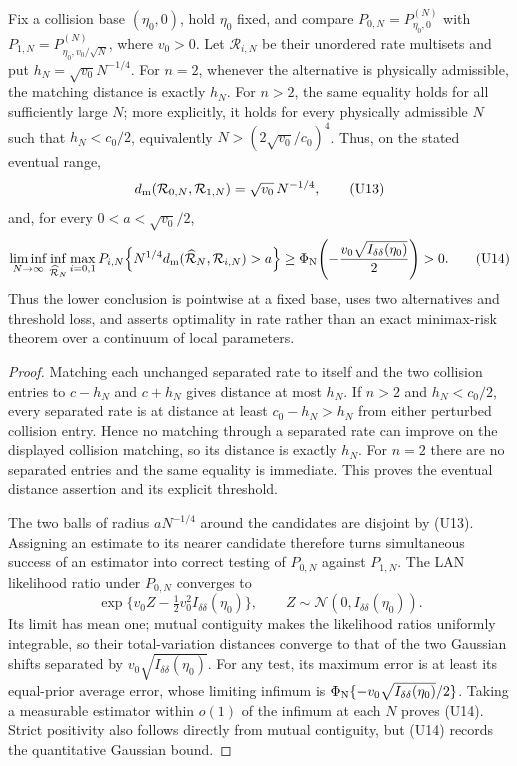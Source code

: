 \begin{lemma}
\label{lem:two-point-threshold-rate-main}
Fix a collision base \((\eta_0,0)\), hold \(\eta_0\) fixed, and compare
\(P_{0,N}=P_{\eta_0,0}^{(N)}\) with
\(P_{1,N}=P_{\eta_0,v_0/\sqrt N}^{(N)}\), where \(v_0>0\).  Let
\(\mathcal R_{i,N}\) be their unordered rate multisets and put
\(h_N=\sqrt{v_0}N^{-1/4}\).  For \(n=2\), whenever the alternative is
physically admissible, the matching distance is exactly \(h_N\).  For
\(n>2\), the same equality holds for all sufficiently large \(N\); more
explicitly, it holds for every physically admissible \(N\) such that
\(h_N<c_0/2\), equivalently
\(N>(2\sqrt{v_0}/c_0)^4\).  Thus, on the stated eventual range,
\[
 d_{\rm m}(\mathcal R_{0,N},\mathcal R_{1,N})
 =\sqrt{v_0}\,N^{-1/4},
\tag{U13}
\]
and, for every \(0<a<\sqrt{v_0}/2\),
\[
 \liminf_{N\to\infty}\inf_{\widehat{\mathcal R}_N}
 \max_{i=0,1}P_{i,N}\!\left\{
 N^{1/4}d_{\rm m}(\widehat{\mathcal R}_N,\mathcal R_{i,N})>a
 \right\}
 \ge \Phi_{\rm N}\!\left(
 -\frac{v_0\sqrt{I_{\delta\delta}(\eta_0)}}2\right)>0.
\tag{U14}
\]
Thus the lower conclusion is pointwise at a fixed base, uses two alternatives
and threshold loss, and asserts optimality in rate rather than an exact
minimax-risk theorem over a continuum of local parameters.
\end{lemma}

\begin{proof}
Matching each unchanged separated rate to itself and the two collision
entries to \(c-h_N\) and \(c+h_N\) gives distance at most \(h_N\).  If
\(n>2\) and \(h_N<c_0/2\), every separated rate is at distance at least
\(c_0-h_N>h_N\) from either perturbed collision entry.  Hence no matching
through a separated rate can improve on the displayed collision matching,
so its distance is exactly \(h_N\).  For \(n=2\) there are no separated
entries and the same equality is immediate.  This proves the eventual
distance assertion and its explicit threshold.

The two balls of radius \(aN^{-1/4}\) around the candidates are disjoint by
\textup{(U13)}.  Assigning an estimate to its nearer candidate therefore
turns simultaneous success of an estimator into correct testing of
\(P_{0,N}\) against \(P_{1,N}\).  The LAN likelihood ratio under \(P_{0,N}\)
converges to
\[
 \exp\{v_0Z-\tfrac12v_0^2I_{\delta\delta}(\eta_0)\},
 \qquad Z\sim\mathcal N(0,I_{\delta\delta}(\eta_0)).
\tag{U15}
\]
Its limit has mean one; mutual contiguity makes the likelihood ratios uniformly
integrable, so their total-variation distances converge to that of the two
Gaussian shifts separated by
\(v_0\sqrt{I_{\delta\delta}(\eta_0)}\).  For any test, its maximum error is at
least its equal-prior average error, whose limiting infimum is
\(\Phi_{\rm N}\{-v_0\sqrt{I_{\delta\delta}(\eta_0)}/2\}\).  Taking a
measurable estimator within \(o(1)\) of the infimum at each \(N\) proves
\textup{(U14)}.  Strict positivity also follows directly from mutual
contiguity, but \textup{(U14)} records the quantitative Gaussian bound.
\end{proof}

